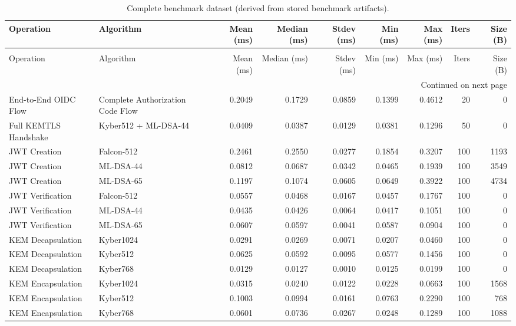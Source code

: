 \begin{longtable}{p{2.8cm}p{2.6cm}rrrrrrr}
\caption{Complete benchmark dataset (derived from stored benchmark artifacts).} \label{tab:full-results} \\
\toprule\rowcolor{black!5}
Operation & Algorithm & Mean (ms) & Median (ms) & Stdev (ms) & Min (ms) & Max (ms) & Iters & Size (B) \\
\midrule
\endfirsthead
\caption[]{Complete benchmark dataset (derived from stored benchmark artifacts).} \\
\toprule\rowcolor{black!5}
Operation & Algorithm & Mean (ms) & Median (ms) & Stdev (ms) & Min (ms) & Max (ms) & Iters & Size (B) \\
\midrule
\endhead
\midrule
\multicolumn{9}{r}{Continued on next page} \\
\midrule
\endfoot
\bottomrule
\endlastfoot
End-to-End OIDC Flow & Complete Authorization Code Flow & 0.2049 & 0.1729 & 0.0859 & 0.1399 & 0.4612 & 20 & 0 \\
Full KEMTLS Handshake & Kyber512 + ML-DSA-44 & 0.0409 & 0.0387 & 0.0129 & 0.0381 & 0.1296 & 50 & 0 \\
JWT Creation & Falcon-512 & 0.2461 & 0.2550 & 0.0277 & 0.1854 & 0.3207 & 100 & 1193 \\
JWT Creation & ML-DSA-44 & 0.0812 & 0.0687 & 0.0342 & 0.0465 & 0.1939 & 100 & 3549 \\
JWT Creation & ML-DSA-65 & 0.1197 & 0.1074 & 0.0605 & 0.0649 & 0.3922 & 100 & 4734 \\
JWT Verification & Falcon-512 & 0.0557 & 0.0468 & 0.0167 & 0.0457 & 0.1767 & 100 & 0 \\
JWT Verification & ML-DSA-44 & 0.0435 & 0.0426 & 0.0064 & 0.0417 & 0.1051 & 100 & 0 \\
JWT Verification & ML-DSA-65 & 0.0607 & 0.0597 & 0.0041 & 0.0587 & 0.0904 & 100 & 0 \\
KEM Decapsulation & Kyber1024 & 0.0291 & 0.0269 & 0.0071 & 0.0207 & 0.0460 & 100 & 0 \\
KEM Decapsulation & Kyber512 & 0.0625 & 0.0592 & 0.0095 & 0.0577 & 0.1456 & 100 & 0 \\
KEM Decapsulation & Kyber768 & 0.0129 & 0.0127 & 0.0010 & 0.0125 & 0.0199 & 100 & 0 \\
KEM Encapsulation & Kyber1024 & 0.0315 & 0.0240 & 0.0122 & 0.0228 & 0.0663 & 100 & 1568 \\
KEM Encapsulation & Kyber512 & 0.1003 & 0.0994 & 0.0161 & 0.0763 & 0.2290 & 100 & 768 \\
KEM Encapsulation & Kyber768 & 0.0601 & 0.0736 & 0.0267 & 0.0248 & 0.1289 & 100 & 1088 \\

\end{longtable}
